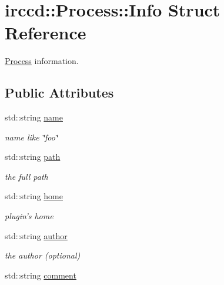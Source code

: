 \hypertarget{a00030}{\section{irccd\-:\-:Process\-:\-:Info Struct Reference}
\label{a00030}
}


\hyperlink{a00052}{Process} information.  


\subsection*{Public Attributes}
\begin{DoxyCompactItemize}
\item 
\hypertarget{a00030_a33f79f0f9e90c5c6860f58547b5c341f}{std\-::string \hyperlink{a00030_a33f79f0f9e90c5c6860f58547b5c341f}{name}}\label{a00030_a33f79f0f9e90c5c6860f58547b5c341f}

\begin{DoxyCompactList}\small\item\em name like \char`\"{}foo\char`\"{} \end{DoxyCompactList}\item 
\hypertarget{a00030_a465393c01c5448133239c9f4b3562a58}{std\-::string \hyperlink{a00030_a465393c01c5448133239c9f4b3562a58}{path}}\label{a00030_a465393c01c5448133239c9f4b3562a58}

\begin{DoxyCompactList}\small\item\em the full path \end{DoxyCompactList}\item 
\hypertarget{a00030_a2caaa3f15baa7a8304b809dc03759362}{std\-::string \hyperlink{a00030_a2caaa3f15baa7a8304b809dc03759362}{home}}\label{a00030_a2caaa3f15baa7a8304b809dc03759362}

\begin{DoxyCompactList}\small\item\em plugin's home \end{DoxyCompactList}\item 
\hypertarget{a00030_a05ea4ca6ef7a18bab4b8a9823413748d}{std\-::string \hyperlink{a00030_a05ea4ca6ef7a18bab4b8a9823413748d}{author}}\label{a00030_a05ea4ca6ef7a18bab4b8a9823413748d}

\begin{DoxyCompactList}\small\item\em the author (optional) \end{DoxyCompactList}\item 
\hypertarget{a00030_a4cf59d58a8f4243849bcff4317459786}{std\-::string \hyperlink{a00030_a4cf59d58a8f4243849bcff4317459786}{comment}}\label{a00030_a4cf59d58a8f4243849bcff4317459786}


\end{DoxyCompactItemize}
